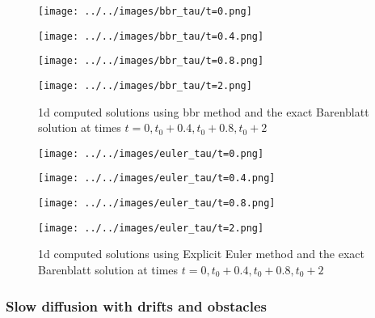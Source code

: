\documentclass{jsarticle}
\theoremstyle{definition}
\begin{document}
\begin{figure}
    \centering
    \begin{minipage}{0.4\hsize}
        \texttt{[image: ../../images/bbr\_tau/t=0.png]}
        \caption{$t = 0$}
    \end{minipage}
    \begin{minipage}{0.4\hsize}
        \texttt{[image: ../../images/bbr\_tau/t=0.4.png]}
        \caption{$t = 0.4$}
    \end{minipage}
    \begin{minipage}{0.4\hsize}
        \texttt{[image: ../../images/bbr\_tau/t=0.8.png]}
        \caption{$t = 0.8$}
    \end{minipage}
    \begin{minipage}{0.4\hsize}
        \texttt{[image: ../../images/bbr\_tau/t=2.png]}
        \caption{$t = 2$}
    \end{minipage}
    \caption{1d computed solutions using bbr method and the exact Barenblatt solution at times $t  = 0, t_0 + 0.4, t_0 + 0.8, t_0 + 2$}
\end{figure}

\begin{figure}
    \centering
    \begin{minipage}{0.4\hsize}
        \texttt{[image: ../../images/euler\_tau/t=0.png]}
        \caption{$t = 0$}
    \end{minipage}
    \begin{minipage}{0.4\hsize}
        \texttt{[image: ../../images/euler\_tau/t=0.4.png]}
        \caption{$t = 0.4$}
    \end{minipage}
    \begin{minipage}{0.4\hsize}
        \texttt{[image: ../../images/euler\_tau/t=0.8.png]}
        \caption{$t = 0.8$}
    \end{minipage}
    \begin{minipage}{0.4\hsize}
        \texttt{[image: ../../images/euler\_tau/t=2.png]}
        \caption{$t = 2$}
    \end{minipage}
    \caption{1d computed solutions using Explicit Euler method and the exact Barenblatt solution at times $t  = 0, t_0 + 0.4, t_0 + 0.8, t_0 + 2$}
\end{figure}

\subsubsection{Slow diffusion with drifts and obstacles}
\end{document}
